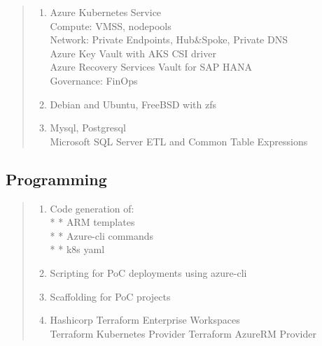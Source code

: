 \documentclass[a4paper]{report}
\begin{document}
\begin{quote}

\begin{enumerate}

\item[\textbf{Cloud}]
                    Azure Kubernetes Service\\
                    Compute: VMSS, nodepools\\
                    Network: Private Endpoints, Hub\&Spoke, Private DNS\\
                    Azure Key Vault with AKS CSI driver\\
                    Azure Recovery Services Vault for SAP HANA\\
                    Governance: FinOps

\item[\textbf{Operating Systems}]
                    Debian and Ubuntu, FreeBSD with zfs

\item[\textbf{Databases}]
                    Mysql, Postgresql\\
                    Microsoft SQL Server ETL and Common Table Expressions

\end{enumerate}

\end{quote}

\subsection*{Programming}

\begin{quote}

\begin{enumerate}

\item[\textbf{Python3}]
                    Code generation of:\\
                    * * ARM templates\\
                    * * Azure-cli commands\\
                    * * k8s yaml

\item[\textbf{Bash}]
                    Scripting for PoC deployments using azure-cli

\item[\textbf{GNU Make}]
                    Scaffolding for PoC projects

\item[\textbf{Terraform}]
                    Hashicorp Terraform Enterprise Workspaces\\
                    Terraform Kubernetes Provider
                    Terraform AzureRM Provider

\end{enumerate}

\end{quote}
\end{document}
